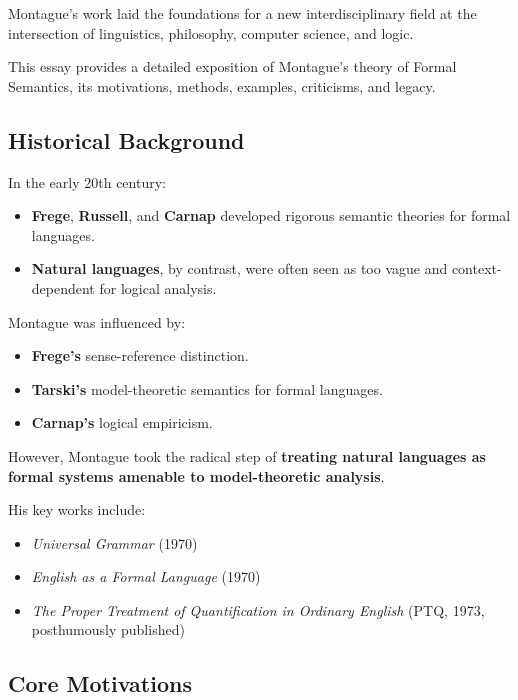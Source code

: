 \documentclass[12pt]{article}
\newcommand{\tightlist}{\itemsep 0pt\parskip 0pt\parsep 0pt}
\begin{document}
Montague's work laid the foundations for a new interdisciplinary field
at the intersection of linguistics, philosophy, computer science, and
logic.

This essay provides a detailed exposition of Montague's theory of Formal
Semantics, its motivations, methods, examples, criticisms, and legacy.

\hypertarget{historical-background}{%
\subsection{Historical Background}\label{historical-background}}

In the early 20th century:

\begin{itemize}
\tightlist
\item
  \textbf{Frege}, \textbf{Russell}, and \textbf{Carnap} developed
  rigorous semantic theories for formal languages.
\item
  \textbf{Natural languages}, by contrast, were often seen as too vague
  and context-dependent for logical analysis.
\end{itemize}

Montague was influenced by:

\begin{itemize}
\tightlist
\item
  \textbf{Frege's} sense-reference distinction.
\item
  \textbf{Tarski's} model-theoretic semantics for formal languages.
\item
  \textbf{Carnap's} logical empiricism.
\end{itemize}

However, Montague took the radical step of \textbf{treating natural
languages as formal systems amenable to model-theoretic analysis}.

His key works include:

\begin{itemize}
\tightlist
\item
  \emph{Universal Grammar} (1970)
\item
  \emph{English as a Formal Language} (1970)
\item
  \emph{The Proper Treatment of Quantification in Ordinary English}
  (PTQ, 1973, posthumously published)
\end{itemize}

\hypertarget{core-motivations}{%
\subsection{Core Motivations}\label{core-motivations}}
\end{document}
